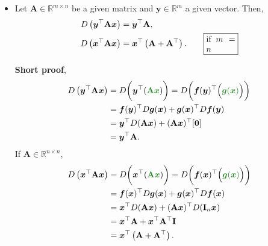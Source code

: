 \documentclass[12pt,thmsa]{article}
\begin{document}
\begin{itemize}
	\vspace{5cm}

	\item Let \(\mathbf{A} \in \mathbb{R}^{m \times n}\) be a given matrix and \(\boldsymbol{y} \in \mathbb{R}^{m}\) a given vector. Then,
	\begin{align*}
		D\left(\boldsymbol{y}^{\top} \mathbf{A} \boldsymbol{x}\right) &=
		\boldsymbol{y}^{\top} \mathbf{A}, \\
		D\left(\boldsymbol{x}^{\top} \mathbf{A} \boldsymbol{x}\right) &=
		\boldsymbol{x}^{\top}\left(\mathbf{A}+\mathbf{A}^{\top}\right).  \qquad
		\fbox{\parbox{0.1\textwidth}{ if \(m=n\) }}
	\end{align*}
	
	\textbf{Short proof},
	\[\begin{aligned}    
		D\left(\boldsymbol{y}^{\top} \mathbf{A} \boldsymbol{x}\right) 
		&=D \bigg ( \boldsymbol{y}^{\top}( {\color{forestgreen}{\mathbf{A} \boldsymbol{x}}} ) \bigg )
		=D \bigg ( \boldsymbol{f}(\boldsymbol{y})^{\top} \Big( {\color{forestgreen}{\boldsymbol{g}(\boldsymbol{x})}} \Big) \bigg ) \\    
		&=\boldsymbol{f}(\boldsymbol{y})^{\top} D \boldsymbol{g} (\boldsymbol{x})
		+\boldsymbol{g}(\boldsymbol{x})^{\top} D \boldsymbol{f}(\boldsymbol{y}) \\    
		&=\boldsymbol{y}^{\top} D(\mathbf{A} \boldsymbol{x})+(\mathbf{A} \boldsymbol{x})^{\top}[\mathbf{0}] \\
		&=\boldsymbol{y}^{\top} \mathbf{A}.
	\end{aligned}\]
	If \(\mathbf{A} \in \mathbb{R}^{n \times n}\),
	\[ \begin{aligned}    
		D\left(\boldsymbol{x}^{\top} \mathbf{A} \boldsymbol{x}\right)    
		&=D \bigg( \boldsymbol{x}^{\top}( {\color{forestgreen}{\mathbf{A} \boldsymbol{x}}} ) \bigg)
		=D\bigg(\boldsymbol{f}(\boldsymbol{x})^{\top} \Big( {\color{forestgreen}{\boldsymbol{g}(\boldsymbol{x})}} \Big ) \bigg) \\     
		&=\boldsymbol{f}(\boldsymbol{x})^{\top} D \boldsymbol{g} (\boldsymbol{x})+\boldsymbol{g}(\boldsymbol{x})^{\top} D \boldsymbol{f}(\boldsymbol{x}) \\    
		&=\boldsymbol{x}^{\top} D(\mathbf{A} \boldsymbol{x})+(\mathbf{A} \boldsymbol{x})^{\top} D(\mathbf{I}_{n} \boldsymbol{x}) \\    
		&=\boldsymbol{x}^{\top} \mathbf{A}+\boldsymbol{x}^{\top} \mathbf{A}^{\top} \mathbf{I}  \\
		&=\boldsymbol{x}^{\top} \left(\mathbf{A}+\mathbf{A}^{\top}\right).
	\end{aligned} \]


\end{itemize}
\end{document}
